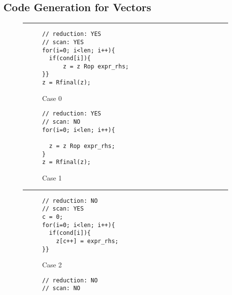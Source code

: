 \subsection{Code Generation for Vectors} \label{SubSec:CodeGen}


\begin{figure}[htbp]
\par\noindent\rule{\columnwidth}{0.6pt}
\begin{subfigure}[t]{.45\columnwidth}
\begin{small}
\begin{verbatim}
// reduction: YES
// scan: YES
for(i=0; i<len; i++){
  if(cond[i]){
      z = z Rop expr_rhs;
}}
z = Rfinal(z);
\end{verbatim}
\end{small}
\caption{Case 0} \label{fig:codegen_c0}
\end{subfigure}
\hspace{1mm}
\hspace{2mm}
\begin{subfigure}[t]{.45\columnwidth}
\begin{small}
\begin{verbatim}
// reduction: YES
// scan: NO
for(i=0; i<len; i++){

  z = z Rop expr_rhs;
}
z = Rfinal(z);
\end{verbatim}
\end{small}
\caption{Case 1} \label{fig:codegen_c1}
\end{subfigure}
\par\noindent\rule{\columnwidth}{0.6pt}
\begin{subfigure}[t]{.45\columnwidth}
\begin{small}
\begin{verbatim}
// reduction: NO
// scan: YES
c = 0;
for(i=0; i<len; i++){
  if(cond[i]){
    z[c++] = expr_rhs;
}}
\end{verbatim}
\end{small}
\caption{Case 2} \label{fig:codegen_c2}
\end{subfigure}
\hspace{1mm}
\hspace{2mm}
\begin{subfigure}[t]{.45\columnwidth}
\begin{small}
\begin{verbatim}
// reduction: NO
// scan: NO


\end{verbatim}
\end{small}
\end{subfigure}
\end{figure}
